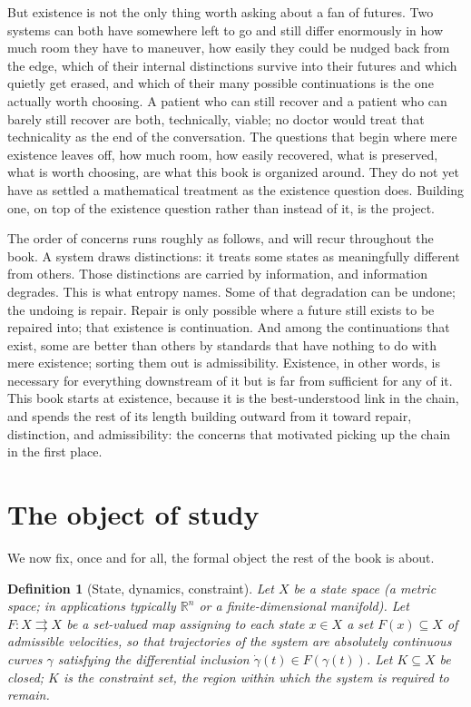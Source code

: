 \documentclass[11pt]{report}
\newtheorem{definition}{Definition}[chapter]
\begin{document}
But existence is not the only thing worth asking about a fan of futures.
Two systems can both have somewhere left to go and still differ enormously
in how much room they have to maneuver, how easily they could be nudged
back from the edge, which of their internal distinctions survive into
their futures and which quietly get erased, and which of their many
possible continuations is the one actually worth choosing. A patient who
can still recover and a patient who can barely still recover are both,
technically, viable; no doctor would treat that technicality as the end
of the conversation. The questions that begin where mere existence leaves off, how much
room, how easily recovered, what is preserved, what is worth choosing,
are what this book is organized around. They
do not yet have as settled a mathematical treatment as the existence
question does. Building one, on top of the existence question rather than
instead of it, is the project.

The order of concerns runs roughly as follows, and will recur throughout
the book. A system draws distinctions: it treats some states as
meaningfully different from others. Those distinctions are carried by
information, and information degrades. This is what entropy names.
Some of that degradation can be undone; the undoing is repair. Repair is
only possible where a future still exists to be repaired into; that
existence is continuation. And among the continuations that exist, some
are better than others by standards that have nothing to do with mere
existence; sorting them out is admissibility. Existence, in other words,
is necessary for everything downstream of it but is far from sufficient
for any of it. This book starts at existence, because it is the
best-understood link in the chain, and spends the rest of its length
building outward from it toward repair, distinction, and admissibility:
the concerns that motivated picking up the chain in the first place.

\section*{The object of study}

We now fix, once and for all, the formal object the rest of the book is
about.

\begin{definition}[State, dynamics, constraint]
Let $X$ be a state space (a metric space; in applications typically
$\mathbb{R}^n$ or a finite-dimensional manifold). Let
$F : X \rightrightarrows X$ be a set-valued map assigning to each state
$x \in X$ a set $F(x) \subseteq X$ of admissible velocities, so that
trajectories of the system are absolutely continuous curves
$\gamma$ satisfying the differential inclusion
$\dot\gamma(t) \in F(\gamma(t))$. Let $K \subseteq X$ be closed; $K$ is
the constraint set, the region within which the system is required to
remain.
\end{definition}
\end{document}
